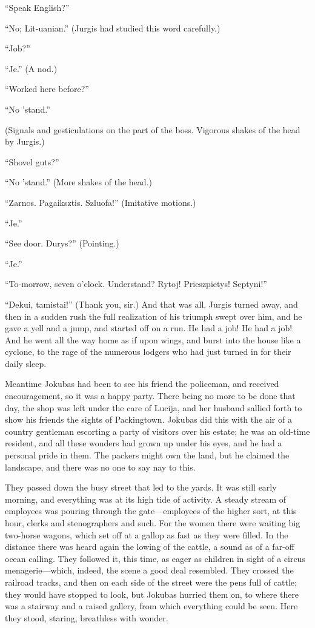 \documentclass[
]{article}
\begin{document}
``Speak English?''

``No; Lit-uanian.'' (Jurgis had studied this word carefully.)

``Job?''

``Je.'' (A nod.)

``Worked here before?''

``No 'stand.''

(Signals and gesticulations on the part of the boss. Vigorous shakes of the head by Jurgis.)

``Shovel guts?''

``No 'stand.'' (More shakes of the head.)

``Zarnos. Pagaiksztis. Szluofa!'' (Imitative motions.)

``Je.''

``See door. Durys?'' (Pointing.)

``Je.''

``To-morrow, seven o'clock. Understand? Rytoj! Prieszpietys! Septyni!''

``Dekui, tamistai!'' (Thank you, sir.) And that was all. Jurgis turned away, and then in a sudden rush the full realization of his triumph swept over him, and he gave a yell and a jump, and started off on a run. He had a job! He had a job! And he went all the way home as if upon wings, and burst into the house like a cyclone, to the rage of the numerous lodgers who had just turned in for their daily sleep.

Meantime Jokubas had been to see his friend the policeman, and received encouragement, so it was a happy party. There being no more to be done that day, the shop was left under the care of Lucija, and her husband sallied forth to show his friends the sights of Packingtown. Jokubas did this with the air of a country gentleman escorting a party of visitors over his estate; he was an old-time resident, and all these wonders had grown up under his eyes, and he had a personal pride in them. The packers might own the land, but he claimed the landscape, and there was no one to say nay to this.

They passed down the busy street that led to the yards. It was still early morning, and everything was at its high tide of activity. A steady stream of employees was pouring through the gate---employees of the higher sort, at this hour, clerks and stenographers and such. For the women there were waiting big two-horse wagons, which set off at a gallop as fast as they were filled. In the distance there was heard again the lowing of the cattle, a sound as of a far-off ocean calling. They followed it, this time, as eager as children in sight of a circus menagerie---which, indeed, the scene a good deal resembled. They crossed the railroad tracks, and then on each side of the street were the pens full of cattle; they would have stopped to look, but Jokubas hurried them on, to where there was a stairway and a raised gallery, from which everything could be seen. Here they stood, staring, breathless with wonder.
\end{document}
